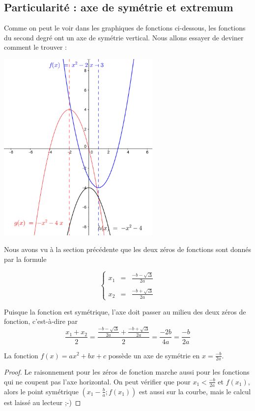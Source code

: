 \subsection{Particularité : axe de symétrie et extremum}

Comme on peut le voir dans les graphiques de fonctions ci-dessous, les fonctions du second degré ont un axe de symétrie vertical. Nous allons essayer de deviner comment le trouver :

\begin{center}
\includegraphics[width = 0.6\textwidth]{quadratique/quadratique.png}
\end{center}

Nous avons vu à la section précédente que les deux zéros de fonctions sont donnés par la formule 

$$
\left\{
\begin{array}{lcl}
x_1 &=& \frac{-b-\sqrt{\Delta}}{2a}\\
&&\\
x_2 &=& \frac{-b+\sqrt{\Delta}}{2a}
\end{array}
\right.
$$

Puisque la fonction est symétrique, l'axe doit passer au milieu des deux zéros de fonction, c'est-à-dire par
$$
\frac{x_1+x_2}{2} = \frac{\frac{-b-\sqrt{\Delta}}{2a}+\frac{-b+\sqrt{\Delta}}{2a}}{2} = \frac{-2b}{4a} = \frac{-b}{2a}
$$

\begin{proposition}
La fonction $f(x) = ax^2 + bx+c$ possède un axe de symétrie en $x= \frac{-b}{2a}$.
\end{proposition}

\begin{proof}
Le raisonnement pour les zéros de fonction marche aussi pour les fonctions qui ne coupent pas l'axe horizontal. On peut vérifier que pour $x_1<\frac{-b}{2a}$ et $f(x_1)$, alors le point symétrique $\left(x_1-\frac{b}{a};f(x_1)\right)$ est aussi sur la courbe, mais le calcul est laissé au lecteur ;-)

\end{proof}

